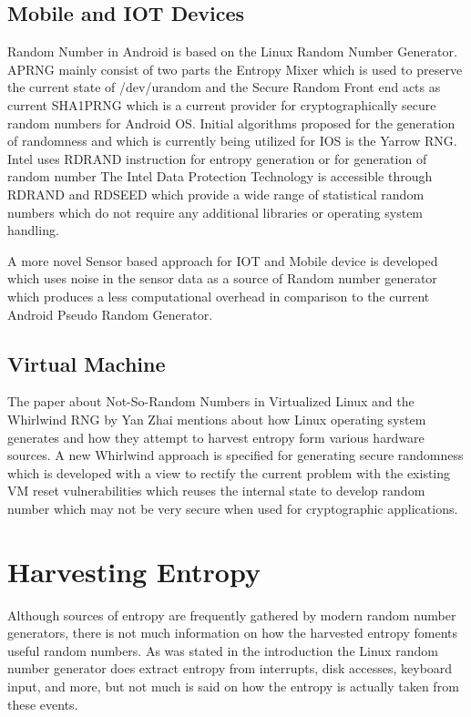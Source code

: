 \documentclass{IEEEtran}
\begin{document}
\subsection{Mobile and IOT Devices}

Random Number in Android is based on the Linux Random Number Generator. APRNG mainly consist of two parts the Entropy Mixer  which is used to preserve the current state of /dev/urandom  and the Secure Random Front end acts as current SHA1PRNG which is a current provider for cryptographically secure random numbers for Android OS. Initial algorithms proposed for the generation of randomness and which is currently being utilized for IOS is the Yarrow RNG. Intel uses RDRAND instruction for entropy generation or for generation of random number The Intel Data Protection Technology is accessible through RDRAND and RDSEED which provide a wide range of statistical random numbers which do not require any additional libraries or operating system handling.

 A more novel Sensor based approach for IOT and Mobile device is developed which uses noise in the sensor data as a source of Random number generator  which produces a less computational overhead in comparison to the current Android Pseudo Random Generator. \cite{Wal16}

\subsection{Virtual Machine}

The paper about Not-So-Random Numbers in Virtualized Linux and the Whirlwind RNG by Yan Zhai mentions about how Linux operating system generates and how they attempt to harvest entropy form various hardware sources. A new Whirlwind approach is specified for generating secure  randomness which is developed with a view to rectify the current problem with the existing VM reset vulnerabilities which reuses the internal state to develop random number which may not be very secure when used for  cryptographic applications. \cite{Fer13}


\section{Harvesting Entropy}
Although sources of entropy are frequently gathered by modern random number generators, there is not much information on how the harvested entropy foments useful random numbers. As was stated in the introduction the Linux random number generator does extract entropy from interrupts, disk accesses, keyboard input, and more, but not much is said on how the entropy is actually taken from these events. 
\end{document}
